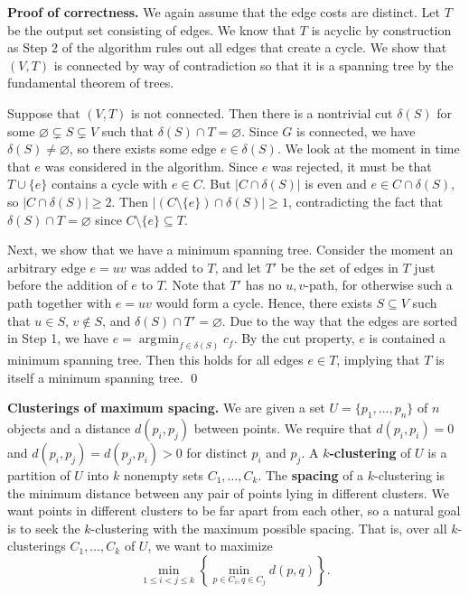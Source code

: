 \documentclass{article}
\DeclareMathOperator*{\argmin}{\arg\!\min}
\begin{document}
{\color{blue} 
{\bf Proof of correctness.} We again assume that the edge costs 
are distinct. Let $T$ be the output set consisting of edges. 
We know that $T$ is acyclic by construction as Step 2 of the algorithm 
rules out all edges that create a cycle. We show that $(V, T)$ is 
connected by way of contradiction so that it is a spanning tree 
by the fundamental theorem of trees. 

Suppose that $(V, T)$ is not connected. Then there is a nontrivial cut 
$\delta(S)$ for some $\varnothing \subsetneq S \subsetneq V$ 
such that $\delta(S) \cap T = \varnothing$. Since $G$ is connected, 
we have $\delta(S) \neq \varnothing$, so there exists some edge $e \in \delta(S)$. 
We look at the moment in time that $e$ was considered in the algorithm. 
Since $e$ was rejected, it must be that $T \cup \{e\}$ contains a cycle with 
$e \in C$. But $|C \cap \delta(S)|$ is even and $e \in C \cap \delta(S)$, so 
$|C \cap \delta(S)| \geq 2$. Then $|(C \setminus \{e\}) \cap \delta(S)| \geq 1$, 
contradicting the fact that $\delta(S) \cap T = \varnothing$ 
since $C \setminus \{e\} \subseteq T$. 

\newpage
Next, we show that we have a minimum spanning tree. Consider the moment 
an arbitrary edge $e = uv$ was added to $T$, and let $T'$ be the 
set of edges in $T$ just before the addition of $e$ to $T$. Note that 
$T'$ has no $u, v$-path, for otherwise such a path together with $e = uv$ 
would form a cycle. Hence, there exists $S \subseteq V$ such that 
$u \in S$, $v \notin S$, and $\delta(S) \cap T' = \varnothing$. Due 
to the way that the edges are sorted in Step 1, we have 
$e = \argmin_{f\in\delta(S)} c_f$. By the cut property, $e$ is 
contained a minimum spanning tree. Then this holds for all edges $e \in T$, 
implying that $T$ is itself a minimum spanning tree. \qed 
}

{\bf Clusterings of maximum spacing.} We are given a set $U = \{p_1, \dots, p_n\}$
of $n$ objects and a distance $d(p_i, p_j)$ between points. 
We require that $d(p_i, p_i) = 0$ and $d(p_i, p_j) = d(p_j, p_i) > 0$ 
for distinct $p_i$ and $p_j$. A {\bf $k$-clustering} of $U$ is a 
partition of $U$ into $k$ nonempty sets $C_1, \dots, C_k$. 
The {\bf spacing} of a $k$-clustering is the minimum distance 
between any pair of points lying in different clusters. We want 
points in different clusters to be far apart from each other, 
so a natural goal is to seek the $k$-clustering 
with the maximum possible spacing. That is, over all 
$k$-clusterings $C_1, \dots, C_k$ of $U$, we want to maximize 
\[ \min_{1\leq i < j\leq k} \left\{ \min_{p\in C_i, q\in C_j} d(p, q) \right\}. \]
\end{document}
